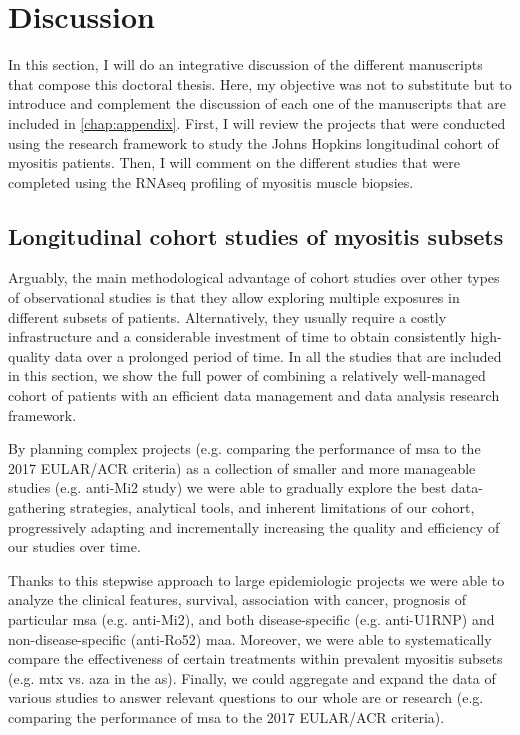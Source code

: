 \chapter{Discussion}

In this section, I will do an integrative discussion of the different manuscripts that compose this doctoral thesis. Here, my objective was not to substitute but to introduce and complement the discussion of each one of the manuscripts that are included in \autoref{chap:appendix}. First, I will review the projects that were conducted using the research framework to study the Johns Hopkins longitudinal cohort of myositis patients. Then, I will comment on the different studies that were completed using the RNAseq profiling of myositis muscle biopsies. 

\section{Longitudinal cohort studies of myositis subsets}

Arguably, the main methodological advantage of cohort studies over other types of observational studies is that they allow exploring multiple exposures in different subsets of patients. Alternatively, they usually require a costly infrastructure and a considerable investment of time to obtain consistently high-quality data over a prolonged period of time. In all the studies that are included in this section, we show the full power of combining a relatively well-managed cohort of patients with an efficient data management and data analysis research framework.

By planning complex projects (e.g. comparing the performance of \gls{msa} to the 2017 EULAR/ACR criteria) as a collection of smaller and more manageable studies (e.g. anti-Mi2 study) we were able to gradually explore the best data-gathering strategies, analytical tools, and inherent limitations of our cohort, progressively adapting and incrementally increasing the quality and efficiency of our studies over time.

Thanks to this stepwise approach to large epidemiologic projects we were able to analyze the clinical features, survival, association with cancer, prognosis of particular \gls{msa} (e.g. anti-Mi2), and both disease-specific (e.g. anti-U1RNP) and non-disease-specific (anti-Ro52) \gls{maa}. Moreover, we were able to systematically compare the effectiveness of certain treatments within prevalent myositis subsets (e.g. \gls{mtx} vs. \gls{aza} in the \gls{as}). Finally, we could aggregate and expand the data of various studies to answer relevant questions to our whole are or research (e.g. comparing the performance of \gls{msa} to the 2017 EULAR/ACR criteria).

